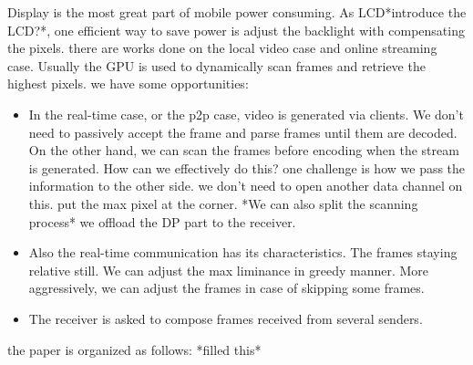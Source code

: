Display is the most great part of mobile power consuming. As
LCD*introduce the LCD?*, one 
efficient way to save power is adjust the backlight with compensating
the pixels. there are works done on the local video case and online
streaming case. Usually the GPU is used to dynamically scan frames and
retrieve the highest pixels. we have some opportunities:
\begin{itemize}
  \item
    {
      In the real-time case, or the p2p case, video is generated via
      clients. We don't need to passively accept the frame and parse
      frames until them are decoded. On the other hand, we can scan
      the frames before encoding when the stream is
      generated. How can we effectively do this? one challenge is how
      we pass the information to the other side. we
      don't need to open another data channel on this. put the max
      pixel at the corner.
      *We can also split the scanning process*
      we offload the DP part to the receiver.
    }
  \item
    {
      Also the real-time communication has its characteristics. The
      frames staying relative still. We can adjust the max liminance
      in greedy manner. More aggressively, we can adjust the frames
      in case of skipping some frames. 
    }
  \item
    {
      The receiver is asked to compose frames received from several
      senders. 
    }
\end{itemize}

the paper is organized as follows: *filled this*

